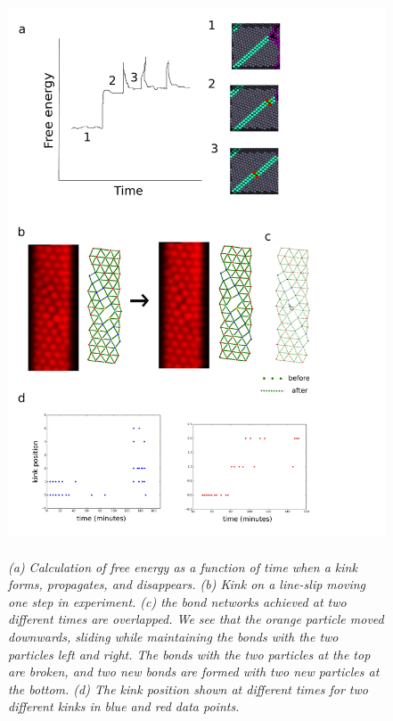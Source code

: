 \documentclass[12pt]{article}
\begin{document}
\begin{figure}[!ht]
	\setcounter{topnumber}{1}
	\setcounter{bottomnumber}{1}
	\setcounter{totalnumber}{1}
	\renewcommand{\topfraction}{0.95}
	\renewcommand{\bottomfraction}{0.95}
	\renewcommand{\textfraction}{0.15}
	\renewcommand{\floatpagefraction}{0.9}
    \centering
    \includegraphics[width = 12cm, height = 16.8cm]{fig4-new}
    \caption{\textit{(a) Calculation of free energy as a function of time when a kink forms, propagates, and disappears. (b) Kink on a line-slip  moving one step in experiment. (c) the bond networks achieved at two different times are overlapped. We see that the orange particle moved downwards, sliding while maintaining the bonds with the two particles left and right. The bonds with the two particles at the top are broken, and two new bonds are formed with two new particles at the bottom. (d) The kink position shown at different times for two different kinks in blue and red data points. }}
    \label{fig4:kink-dynamics}
\end{figure}
\end{document}
